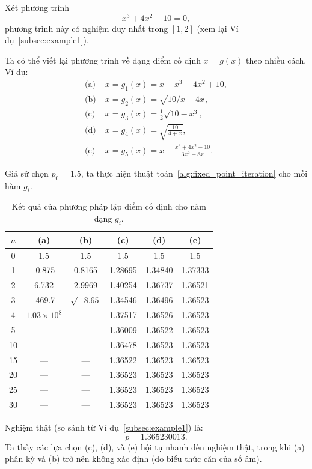 Xét phương trình
\[
x^3 + 4x^2 - 10 = 0,
\]
phương trình này có nghiệm duy nhất trong $[1,2]$ (xem lại Ví dụ~\ref{subsec:example1}).

Ta có thể viết lại phương trình về dạng điểm cố định $x = g(x)$ theo nhiều cách.
Ví dụ:
\begin{align*}
\text{(a)}\;& x = g_1(x) = x - x^3 - 4x^2 + 10,\\
\text{(b)}\;& x = g_2(x) = \sqrt{10/x - 4x},\\
\text{(c)}\;& x = g_3(x) = \tfrac{1}{2}\sqrt{10 - x^3},\\
\text{(d)}\;& x = g_4(x) = \sqrt{\tfrac{10}{4 + x}},\\
\text{(e)}\;& x = g_5(x) = x - \frac{x^3 + 4x^2 - 10}{3x^2 + 8x}.
\end{align*}

Giả sử chọn $p_0 = 1.5$, ta thực hiện thuật toán~\ref{alg:fixed_point_iteration} cho mỗi hàm $g_i$.

\begin{table}[!h]
\centering
\caption{Kết quả của phương pháp lặp điểm cố định cho năm dạng $g_i$.}
\label{tab:fixed_point_results}
\begin{tabular}{c|ccccc}
\toprule
$n$ & (a) & (b) & (c) & (d) & (e) \\
\midrule
0  & 1.5 & 1.5 & 1.5 & 1.5 & 1.5 \\
1  & -0.875 & 0.8165 & 1.28695 & 1.34840 & 1.37333 \\
2  & 6.732 & 2.9969 & 1.40254 & 1.36737 & 1.36521 \\
3  & -469.7 & $\sqrt{-8.65}$ & 1.34546 & 1.36496 & 1.36523 \\
4  & $1.03\times10^8$ & --- & 1.37517 & 1.36526 & 1.36523 \\
5  & --- & --- & 1.36009 & 1.36522 & 1.36523 \\
10 & --- & --- & 1.36478 & 1.36523 & 1.36523 \\
15 & --- & --- & 1.36522 & 1.36523 & 1.36523 \\
20 & --- & --- & 1.36523 & 1.36523 & 1.36523 \\
25 & --- & --- & 1.36523 & 1.36523 & 1.36523 \\
30 & --- & --- & 1.36523 & 1.36523 & 1.36523 \\
\bottomrule
\end{tabular}
\end{table}

Nghiệm thật (so sánh từ Ví dụ~\ref{subsec:example1}) là:
\[
p = 1.365230013.
\]
Ta thấy các lựa chọn (c), (d), và (e) hội tụ nhanh đến nghiệm thật, trong khi (a) phân kỳ
và (b) trở nên không xác định (do biểu thức căn của số âm).

